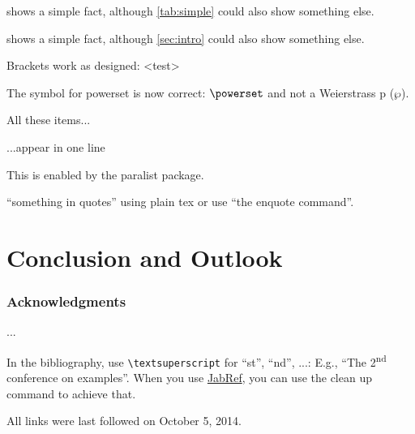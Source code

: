 \documentclass[runningheads,a4paper]{llncs}
\begin{document}
 shows a simple fact, although \cref{tab:simple} could also show something else.

 shows a simple fact, although \cref{sec:intro} could also show something else.

Brackets work as designed:
<test>

The symbol for powerset is now correct: $\powerset$ and not a Weierstrass p ($\wp$).

\begin{inparaenum}
\item All these items...
\item ...appear in one line
\item This is enabled by the paralist package.
\end{inparaenum}

``something in quotes'' using plain tex or use \enquote{the enquote command}.

\section{Conclusion and Outlook}

\subsubsection*{Acknowledgments}
...

In the bibliography, use \texttt{\textbackslash textsuperscript} for ``st'', ``nd'', ...:
E.g., \enquote{The 2\textsuperscript{nd} conference on examples}.
When you use \href{https://www.jabref.org}{JabRef}, you can use the clean up command to achieve that.




All links were last followed on October 5, 2014.
\end{document}
